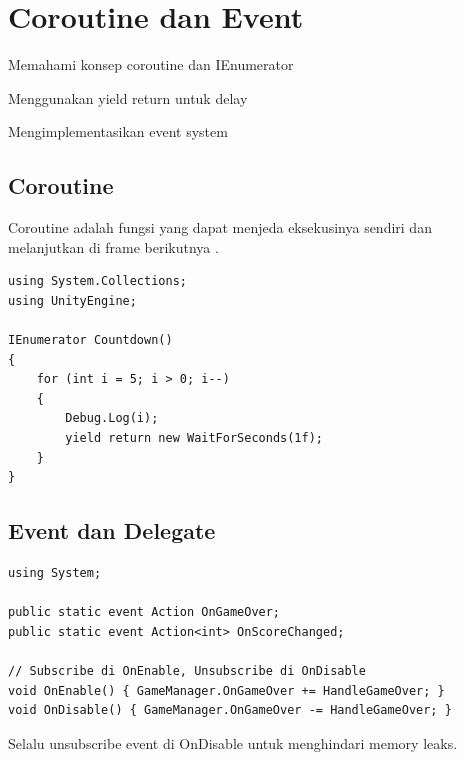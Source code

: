 \section{Coroutine dan Event}

\begin{learningoutcomes}
\item Memahami konsep coroutine dan IEnumerator
\item Menggunakan yield return untuk delay
\item Mengimplementasikan event system
\end{learningoutcomes}

\subsection{Coroutine}

\begin{definisi}[Coroutine]
Coroutine adalah fungsi yang dapat menjeda eksekusinya sendiri dan melanjutkan di frame berikutnya \cite{UnityScriptingAPI2024}.
\end{definisi}

\begin{lstlisting}[language={[Sharp]C}]
using System.Collections;
using UnityEngine;

IEnumerator Countdown()
{
    for (int i = 5; i > 0; i--)
    {
        Debug.Log(i);
        yield return new WaitForSeconds(1f);
    }
}
\end{lstlisting}

\subsection{Event dan Delegate}

\begin{lstlisting}[language={[Sharp]C}]
using System;

public static event Action OnGameOver;
public static event Action<int> OnScoreChanged;

// Subscribe di OnEnable, Unsubscribe di OnDisable
void OnEnable() { GameManager.OnGameOver += HandleGameOver; }
void OnDisable() { GameManager.OnGameOver -= HandleGameOver; }
\end{lstlisting}

\begin{catatan}
Selalu unsubscribe event di OnDisable untuk menghindari memory leaks.
\end{catatan}
